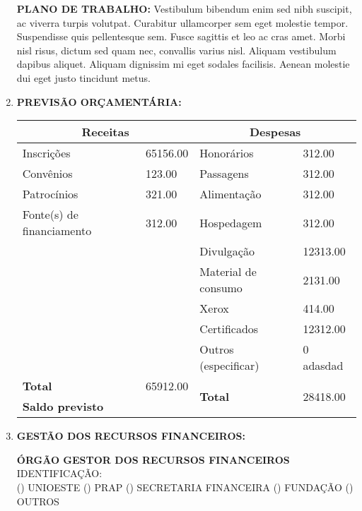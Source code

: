 \documentclass[12pt,a4paper,oneside,brazil]{article}%
\begin{document}
\begin{enumerate}
{\begin{tabularx}{\linewidth}
\hline%
\end{tabularx}%
\linebreak%
\begin{mdframed}[innertopmargin=5pt, innerleftmargin=3pt, innerrightmargin=3pt, topline=false]%
\textbf{PLANO DE TRABALHO: }%
Vestibulum bibendum enim sed nibh suscipit, ac viverra turpis volutpat. Curabitur ullamcorper sem eget molestie tempor. Suspendisse quis pellentesque sem. Fusce sagittis et leo ac cras amet.%
\newline%
Morbi nisl risus, dictum sed quam nec, convallis varius nisl. Aliquam vestibulum dapibus aliquet. Aliquam dignissim mi eget sodales facilisis. Aenean molestie dui eget justo tincidunt metus.%
\newline%
\end{mdframed}%
}%
\item%
\textbf{PREVISÃO ORÇAMENTÁRIA: }%
\newline%
\begin{tabularx}{\linewidth}{|X|X|X|X|}%
\hline%
\multicolumn{2}{|c|}{\textbf{Receitas}}&\multicolumn{2}{c|}{\textbf{Despesas}}\\%
\hline%
Inscrições&65156.00&Honorários&312.00\\%
\hline%
Convênios&123.00&Passagens&312.00\\%
\hline%
Patrocínios&321.00&Alimentação&312.00\\%
\hline%
Fonte(s) de financiamento&312.00&Hospedagem&312.00\\%
\hline%
&&Divulgação&12313.00\\%
\hline%
&&Material de consumo&2131.00\\%
\hline%
&&Xerox&414.00\\%
\hline%
&&Certificados&12312.00\\%
\hline%
&&Outros (especificar)&0\newline%
adasdad\\%
\hline%
\textbf{Total}&65912.00&\multirow{2}{*}{\textbf{Total}}&\multirow{2}{*}{28418.00}\\%
\cline{1-2}%
\textbf{Saldo previsto}&&&\\%
\hline%
\end{tabularx}%
\item%
\textbf{GESTÃO DOS RECURSOS FINANCEIROS: }%
\newline%
\begin{mdframed}[innertopmargin=5pt, innerleftmargin=3pt, innerrightmargin=3pt]%
\textbf{ÓRGÃO GESTOR DOS RECURSOS FINANCEIROS }%
\newline%
IDENTIFICAÇÃO: \\%
() UNIOESTE%
\newline%
() PRAP%
\newline%
() SECRETARIA FINANCEIRA%
\newline%
() FUNDAÇÃO%
\newline%
() OUTROS%
\newline%
\end{mdframed}%
\end{enumerate}%
\end{document}
